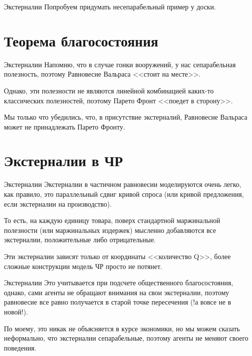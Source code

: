\documentclass{beamer}
\begin{document}
\begin{frame}{Экстерналии}
Попробуем придумать несепарабельный пример у доски.
\end{frame}

\section{Теорема благосостояния}

\begin{frame}{Экстерналии}
Напомню, что в случае гонки вооружений, у нас сепарабельная полезность, поэтому Равновесие Вальраса <<стоит на месте>>. 

Однако, эти полезности не являются линейной комбинацией каких-то классических полезностей, поэтому Парето Фронт <<поедет в сторону>>.

Мы только что убедились, что, в \alert{присутствие экстерналий, Равновесие Вальраса может не принадлежать Парето Фронту}.
\end{frame}

\section{Экстерналии в ЧР}

\begin{frame}{Экстерналии}
Экстерналии в частичном равновесии моделируются очень легко, \alert{как правило, это параллельный сдвиг} кривой спроса (или кривой предложения, если экстерналии на производство).

То есть, на каждую единицу товара, поверх стандартной маржинальной полезности (или маржинальных издержек) мысленно добавляются все экстерналии, положительные либо отрицательные.

Эти экстерналии зависят только от координаты <<количество Q>>, более сложные конструкции модель ЧР просто не потянет.
\end{frame}

\begin{frame}{Экстерналии}
Это учитывается при подсчете общественного благосостояния, однако, сами агенты не обращают внимания на свои экстерналии, поэтому равновесие все равно получается в старой точке пересечения (!а вовсе не в новой!). 

По моему, это никак не объясняется в курсе экономики, но мы можем сказать неформально, что экстерналии сепарабельные, поэтому агенты не меняют своего поведения.
\end{frame}
\end{document}
